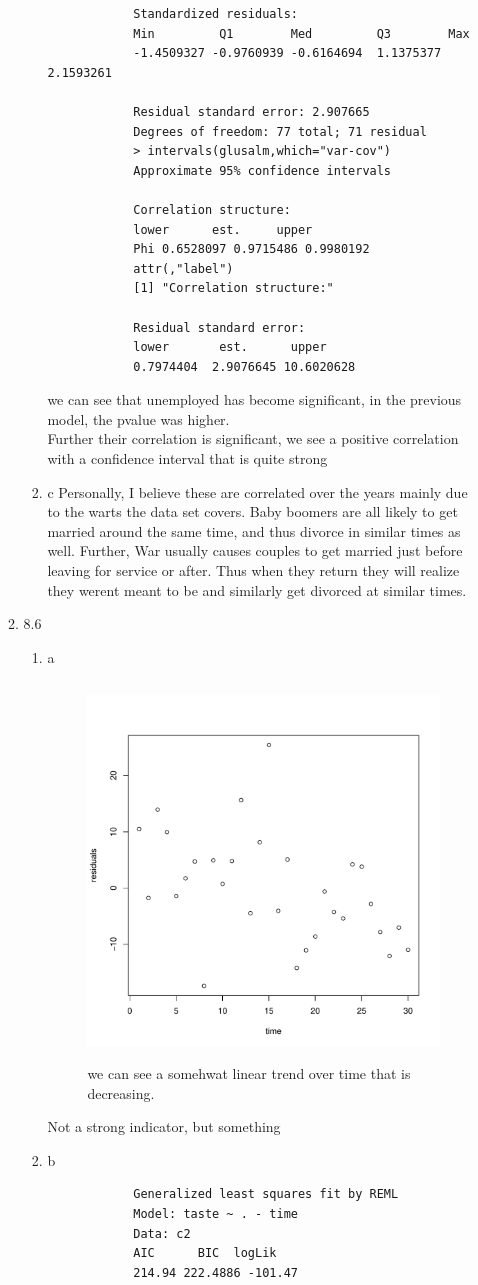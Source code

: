 \documentclass[11pt]{article}
\begin{document}
\begin{enumerate}
\begin{enumerate}
\begin{enumerate}
\begin{verbatim}
			Standardized residuals:
			Min         Q1        Med         Q3        Max 
			-1.4509327 -0.9760939 -0.6164694  1.1375377  2.1593261 
			
			Residual standard error: 2.907665 
			Degrees of freedom: 77 total; 71 residual
			> intervals(glusalm,which="var-cov")
			Approximate 95% confidence intervals
			
			Correlation structure:
			lower      est.     upper
			Phi 0.6528097 0.9715486 0.9980192
			attr(,"label")
			[1] "Correlation structure:"
			
			Residual standard error:
			lower       est.      upper 
			0.7974404  2.9076645 10.6020628 
		\end{verbatim}
		we can see that unemployed has become significant, in the previous model, the pvalue was higher.
		\\
		Further their correlation is significant, we see a positive correlation with a confidence interval that is quite strong
		\item c
		Personally, I believe these are correlated over the years mainly due to the warts the data set covers. Baby boomers are all likely to get married around the same time, and thus divorce in similar times as well. Further, War usually causes couples to get married just before leaving for service or after. Thus when they return they will realize they werent meant to be and similarly get divorced at similar times. 
	\end{enumerate}
	\item 8.6
	\begin{enumerate}
		\item a
		\begin{figure}[H]
			\centering
			\includegraphics[width=10cm,height=10cm]{ovtc.pdf}
			\caption[paic]{we can see a somehwat linear trend over time that is decreasing.}
			\label{ovtc}
		\end{figure}
		Not a strong indicator, but something
		\item b
		\begin{verbatim}
			Generalized least squares fit by REML
			Model: taste ~ . - time 
			Data: c2 
			AIC      BIC  logLik
			214.94 222.4886 -101.47
			

\end{verbatim}
\end{enumerate}
\end{enumerate}
\end{enumerate}
\end{document}
